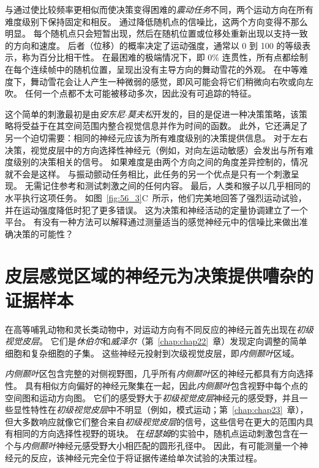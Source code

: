 与通过使比较频率更相似而使决策变得困难的\textit{震动任务}不同，两个运动方向在所有难度级别下保持固定和相反。
通过降低随机点的信噪比，这两个方向变得不那么明显。
每个随机点只会短暂出现，然后在随机位置或位移处重新出现以支持一致的方向和速度。
后者（位移）的概率决定了运动强度，通常以 0 到 100 的等级表示，称为百分比相干性。
在最困难的极端情况下，即 0\% 连贯性，所有点都绘制在每个连续帧中的随机位置，呈现出没有主导方向的舞动雪花的外观。
在中等难度下，舞动雪花会让人产生一种微弱的感觉，即风可能会将它们稍微向右吹或向左吹。
任何一个点都不太可能被移动多次，因此没有可追踪的特征。


这个简单的刺激最初是由\textit{安东尼$\cdot$莫夫松}开发的，目的是促进一种决策策略，该策略将受益于在其空间范围内整合视觉信息并作为时间的函数。
此外，它还满足了另一个迫切需要：相同的神经元应该为所有难度级别的决策提供信息。
对于左右决策，视觉皮层中的方向选择性神经元（例如，对向左运动敏感）会发出与所有难度级别的决策相关的信号。
如果难度是由两个方向之间的角度差异控制的，情况就不会是这样。
与振动颤动任务相比，此任务的另一个优点是只有一个刺激呈现。
无需记住参考和测试刺激之间的任何内容。
最后，人类和猴子以几乎相同的水平执行这项任务。
如图~\ref{fig:56_3}C~所示，他们完美地回答了强烈运动试验，并在运动强度降低时犯了更多错误。
这为决策和神经活动的定量协调建立了一个平台。
有没有一种方法可以解释通过测量适当的感觉神经元中的信噪比来做出准确决策的可能性？



\section{皮层感觉区域的神经元为决策提供嘈杂的证据样本}

在高等哺乳动物和灵长类动物中，对运动方向有不同反应的神经元首先出现在\textit{初级视觉皮层}。
它们是\textit{休伯尔}和\textit{威泽尔}（第~\ref{chap:chap22}~章）发现定向调整的简单细胞和复杂细胞的子集。
这些神经元投射到次级视觉皮层，即\textit{内侧颞叶}区域。


\textit{内侧颞叶}区包含完整的对侧视野图，几乎所有\textit{内侧颞叶}区的神经元都具有方向选择性。
具有相似方向偏好的神经元聚集在一起，因此\textit{内侧颞叶}包含视野中每个点的空间图和运动方向图。
它们的感受野大于\textit{初级视觉皮层}神经元的感受野，并且一些显性特性在\textit{初级视觉皮层}中不明显（例如，模式运动；第~\ref{chap:chap23}~章），但大多数响应就像它们整合来自\textit{初级视觉皮层}的信号，这些信号在更大的范围内具有相同的方向选择性视野的斑块。
在\textit{纽瑟姆}的实验中，随机点运动刺激包含在一个与\textit{内侧颞叶}神经元感受野大小相匹配的圆形孔径中。
因此，有可能测量一个神经元的反应，该神经元完全位于将证据传递给单次试验的决策过程。



